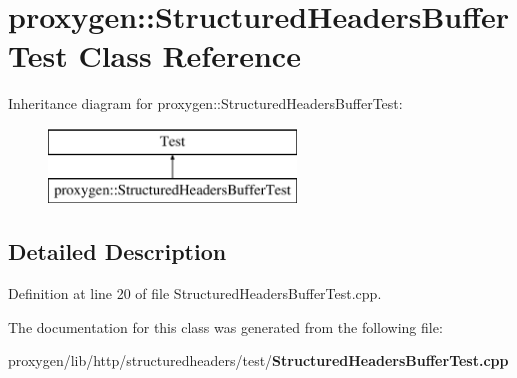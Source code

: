 \section{proxygen\+:\+:Structured\+Headers\+Buffer\+Test Class Reference}
\label{classproxygen_1_1StructuredHeadersBufferTest}
Inheritance diagram for proxygen\+:\+:Structured\+Headers\+Buffer\+Test\+:\begin{figure}[H]
\begin{center}
\leavevmode
\includegraphics[height=2.000000cm]{classproxygen_1_1StructuredHeadersBufferTest}
\end{center}
\end{figure}


\subsection{Detailed Description}


Definition at line 20 of file Structured\+Headers\+Buffer\+Test.\+cpp.



The documentation for this class was generated from the following file\+:\begin{DoxyCompactItemize}
\item 
proxygen/lib/http/structuredheaders/test/{\bf Structured\+Headers\+Buffer\+Test.\+cpp}\end{DoxyCompactItemize}
